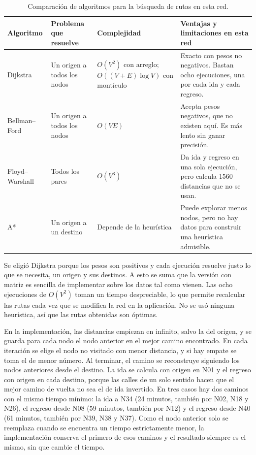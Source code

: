 \documentclass[11pt,letterpaper]{article}
\begin{document}
\begin{table}[htbp]
  \centering
  \small
  \caption{Comparación de algoritmos para la búsqueda de rutas en esta red.}
  \label{tab:algoritmos}
  \begin{tabularx}{\textwidth}{>{\raggedright\arraybackslash}p{2.5cm} >{\raggedright\arraybackslash}p{2.6cm} >{\raggedright\arraybackslash}p{2.9cm} >{\raggedright\arraybackslash}X}
    \toprule
    Algoritmo & Problema que resuelve & Complejidad & Ventajas y limitaciones en esta red \\
    \midrule
    Dijkstra & Un origen a todos los nodos & $O(V^2)$ con arreglo; $O((V+E)\log V)$ con montículo & Exacto con pesos no negativos. Bastan ocho ejecuciones, una por cada ida y cada regreso. \\
    Bellman--Ford & Un origen a todos los nodos & $O(VE)$ & Acepta pesos negativos, que no existen aquí. Es más lento sin ganar precisión. \\
    Floyd--Warshall & Todos los pares & $O(V^3)$ & Da ida y regreso en una sola ejecución, pero calcula 1560 distancias que no se usan. \\
    A* & Un origen a un destino & Depende de la heurística & Puede explorar menos nodos, pero no hay datos para construir una heurística admisible. \\
    \bottomrule
  \end{tabularx}
\end{table}

Se eligió Dijkstra porque los pesos son positivos y cada ejecución resuelve justo lo que se necesita, un origen y sus destinos. A esto se suma que la versión con matriz es sencilla de implementar sobre los datos tal como vienen. Las ocho ejecuciones de $O(V^2)$ toman un tiempo despreciable, lo que permite recalcular las rutas cada vez que se modifica la red en la aplicación. No se usó ninguna heurística, así que las rutas obtenidas son óptimas.

En la implementación, las distancias empiezan en infinito, salvo la del origen, y se guarda para cada nodo el nodo anterior en el mejor camino encontrado. En cada iteración se elige el nodo no visitado con menor distancia, y si hay empate se toma el de menor número. Al terminar, el camino se reconstruye siguiendo los nodos anteriores desde el destino. La ida se calcula con origen en N01 y el regreso con origen en cada destino, porque las calles de un solo sentido hacen que el mejor camino de vuelta no sea el de ida invertido. En tres casos hay dos caminos con el mismo tiempo mínimo: la ida a N34 (24 minutos, también por N02, N18 y N26), el regreso desde N08 (59 minutos, también por N12) y el regreso desde N40 (61 minutos, también por N39, N38 y N37). Como el nodo anterior solo se reemplaza cuando se encuentra un tiempo estrictamente menor, la implementación conserva el primero de esos caminos y el resultado siempre es el mismo, sin que cambie el tiempo.
\end{document}
